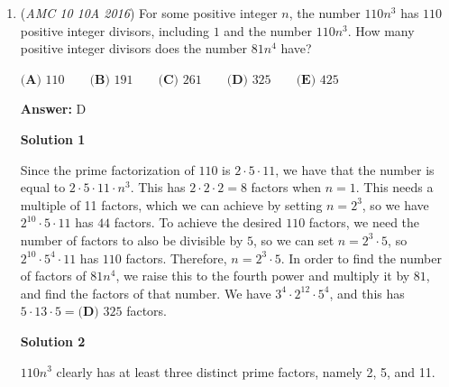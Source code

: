 \begin{enumerate}
 We already know the lengths of $PP'$ and $QQ'$ being $1$ and $2$ respectively (they are the radiuses of the circles). The "height" of the trapezoid is $P'Q'=\sqrt{3^2-1^2}=\sqrt{8}=2\sqrt{2}$ which can be found from the Pythagorean Theorem. So, the area of trapezoid $[PP'QQ']=\frac{1+2}2*{(2\sqrt{2})}=3\sqrt{2}$. Similarly, we can find the area of trapezoid $[Q'QRR']$. $Q'R'=5\sqrt{6}$, so $[Q'QRR']=\frac{2+3}2*{(2\sqrt{6})}=5\sqrt{6}$.

 Now we can put the pieces together. $[PQR]=[PP'QQ']+[Q'QRR']-[PRR'P']=3\sqrt{2}+5\sqrt{6}-[PRR'P']=$. The area of $PRR'P'$ is the long rectangle $[PR"R'P]'+ [PRR"]=4\sqrt{2}+4\sqrt{6}$. $R"$ is the point on $RR'$ in which $PR"$ is perpendicular to $RR'$. 

 So, $[PQR]=3\sqrt{2}+5\sqrt{6}-(4\sqrt{2}+4\sqrt{6})=\boxed{\textbf{(D) }\sqrt{6}-\sqrt{2}.}$



	\item (\textit{AMC 10 10A 2016}) For some positive integer $n$, the number $110n^3$ has $110$ positive integer divisors, including $1$ and the number $110n^3$. How many positive integer divisors does the number $81n^4$ have?


 $\textbf{(A) }110\qquad\textbf{(B) }191\qquad\textbf{(C) }261\qquad\textbf{(D) }325\qquad\textbf{(E) }425$

 \textbf{Answer: }D



\textbf{Solution 1}

Since the prime factorization of $110$ is $2 \cdot 5 \cdot 11$, we have that the number is equal to $2 \cdot 5 \cdot 11 \cdot n^3$.  This has $2 \cdot 2 \cdot 2=8$ factors when $n=1$.  This needs a multiple of 11 factors, which we can achieve by setting $n=2^3$, so we have $2^{10} \cdot 5 \cdot 11$ has $44$ factors.  To achieve the desired $110$ factors, we need the number of factors to also be divisible by $5$, so we can set $n=2^3 \cdot 5$, so $2^{10} \cdot 5^4 \cdot 11$ has $110$ factors.  Therefore, $n=2^3 \cdot 5$.  In order to find the number of factors of $81n^4$, we raise this to the fourth power and multiply it by $81$, and find the factors of that number.  We have $3^4 \cdot 2^{12} \cdot 5^4$, and this has $5 \cdot 13 \cdot 5=\boxed{\textbf{(D) }325}$ factors.

 



\textbf{Solution 2}

$110n^3$ clearly has at least three distinct prime factors, namely 2, 5, and 11.


\end{enumerate}
